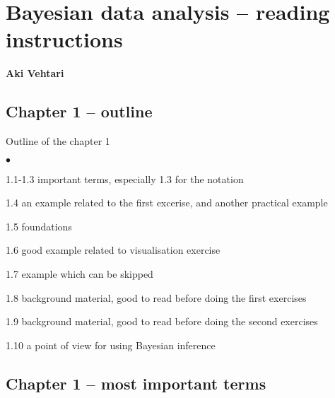 \documentclass[a4paper,11pt,english]{article}
\begin{document}
\thispagestyle{empty}

\section*{Bayesian data analysis -- reading instructions} 
\smallskip
{\bf Aki Vehtari}
\smallskip

\subsection*{Chapter 1 -- outline}

Outline of the chapter 1
\begin{list}{$\bullet$}{\parsep=0pt\itemsep=2pt}
\item 1.1-1.3 important terms, especially 1.3 for the notation
\item 1.4 an example related to the first excerise, and another
  practical example
\item 1.5 foundations
\item 1.6 good example related to visualisation exercise
\item 1.7 example which can be skipped
\item 1.8 background material, good to read before doing the first exercises
\item 1.9 background material, good to read before doing the second exercises
\item 1.10 a point of view for using Bayesian inference
\end{list}

\subsection*{Chapter 1 -- most important terms}
\end{document}
